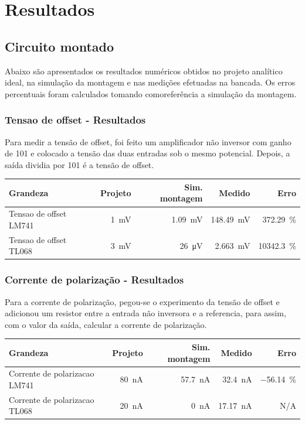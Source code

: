 \documentclass[11pt,a4paper]{article}
\begin{document}
\section{Resultados}

\subsection{Circuito montado}

Abaixo são apresentados os resultados numéricos obtidos no projeto analítico ideal, na simulação
da montagem e nas medições efetuadas na bancada. Os erros percentuais foram calculados tomando comoreferência a simulação da montagem.

\subsubsection{Tensao de offset - Resultados}

Para medir a tensão de offset, foi feito um amplificador não inversor com ganho de 101 e colocado a tensão das duas entradas sob o mesmo potencial.
Depois, a saída dividia por 101 é a tensão de offset.

\begin{center}
\begin{tabular}{@{}lrrrr@{}}
\toprule
\textbf{Grandeza} & \textbf{Projeto} & \textbf{Sim. montagem} & \textbf{Medido} &
\textbf{Erro} \\
\midrule
Tensao de offset LM741 & \SI{1}{\milli\volt} & \SI{1,09}{\milli\volt} & \SI{148,49}{\milli\volt} & \SI{372,29}{\percent} \\
Tensao de offset TL068 & \SI{3}{\milli\volt} & \SI{26}{\micro\volt} & \SI{2,663}{\milli\volt} & \SI{10342,3}{\percent} \\
\bottomrule
\end{tabular}
\end{center}

\subsubsection{Corrente de polarização - Resultados}

Para a corrente de polarização, pegou-se o experimento da tensão de offset e adicionou um resistor entre a entrada não inversora e a referencia,
para assim, com o valor da saída, calcular a corrente de polarização.

\begin{center}
\begin{tabular}{@{}lrrrr@{}}
\toprule
\textbf{Grandeza} & \textbf{Projeto} & \textbf{Sim. montagem} & \textbf{Medido} &
\textbf{Erro} \\
\midrule
Corrente de polarizacao LM741 & \SI{80}{\nano\ampere} & \SI{57,7}{\nano\ampere} & \SI{32,4}{\nano\ampere} & \SI{-56,14}{\percent} \\
Corrente de polarizacao TL068 & \SI{20}{\nano\ampere} & \SI{0}{\nano\ampere} & \SI{17,17}{\nano\ampere} & N/A \\
\bottomrule
\end{tabular}
\end{center}
\end{document}
